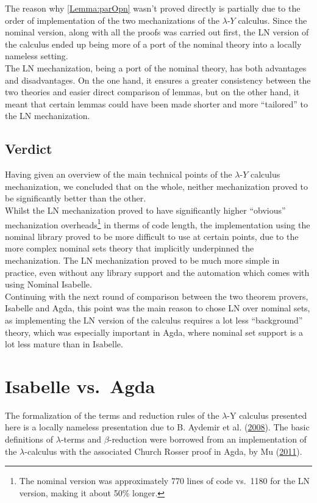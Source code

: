 \documentclass[a4paper, 12pt, twoside]{style/ociamthesis}
\theoremstyle{plain}
\theoremstyle{definition}
\theoremstyle{remark}
\newcommand{\lamy}{\lambda\text{-}Y}
\begin{document}
The reason why \cref{Lemma:parOpn} wasn't proved directly is partially
due to the order of implementation of the two mechanizations of the
\(\lamy\) calculus. Since the nominal version, along with all the proofs
was carried out first, the LN version of the calculus ended up being
more of a port of the nominal theory into a locally nameless setting.\\
The LN mechanization, being a port of the nominal theory, has both
advantages and disadvantages. On the one hand, it ensures a greater
consistency between the two theories and easier direct comparison of
lemmas, but on the other hand, it meant that certain lemmas could have
been made shorter and more ``tailored'' to the LN mechanization.

\section{Verdict}\label{verdict}

Having given an overview of the main technical points of the \(\lamy\)
calculus mechanization, we concluded that on the whole, neither
mechanization proved to be significantly better than the other.\\
Whilst the LN mechanization proved to have significantly higher
``obvious'' mechanization overheads\footnote{The nominal version was
  approximately 770 lines of code vs.~1180 for the LN version, making it
  about 50\% longer.} in therms of code length, the implementation using
the nominal library proved to be more difficult to use at certain
points, due to the more complex nominal sets theory that implicitly
underpinned the mechanization. The LN mechanization proved to be much
more simple in practice, even without any library support and the
automation which comes with using Nominal Isabelle.\\
Continuing with the next round of comparison between the two theorem
provers, Isabelle and Agda, this point was the main reason to chose LN
over nominal sets, as implementing the LN version of the calculus
requires a lot less ``background'' theory, which was especially
important in Agda, where nominal set support is a lot less mature than
in Isabelle.

\chapter{Isabelle vs.~Agda}\label{comp-agda}

\label{chap:compAgda}

The formalization of the terms and reduction rules of the \(\lambda\)-Y
calculus presented here is a locally nameless presentation due to B.
Aydemir et al. (\protect\hyperlink{ref-aydemir08}{2008}). The basic
definitions of \(\lambda\)-terms and \(\beta\)-reduction were borrowed
from an implementation of the \(\lambda\)-calculus with the associated
Church Rosser proof in Agda, by Mu
(\protect\hyperlink{ref-shing-cheng}{2011}).
\end{document}
